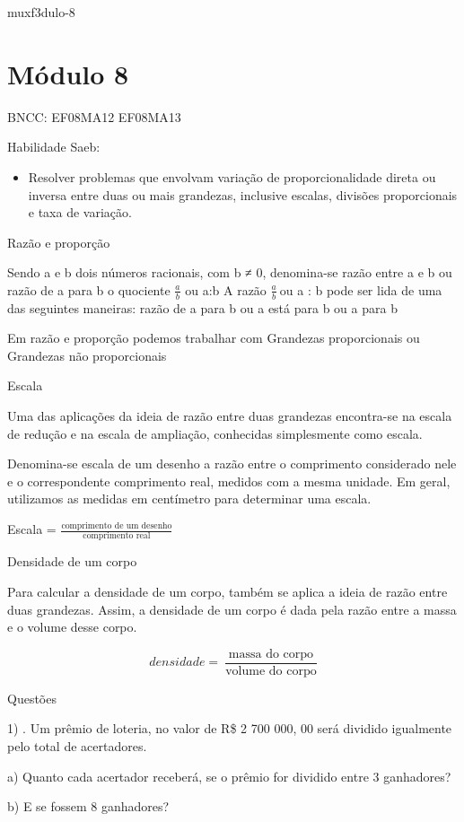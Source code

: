 {muxf3dulo-8}{%
\section{Módulo 8}

BNCC: EF08MA12 EF08MA13

Habilidade Saeb:

\begin{itemize}
\tightlist
\item
  Resolver problemas que envolvam variação de proporcionalidade direta
  ou inversa entre duas ou mais grandezas, inclusive escalas, divisões
  proporcionais e taxa de variação.
\end{itemize}

Razão e proporção

Sendo a e b dois números racionais, com b ≠ 0, denomina-se razão entre a
e b ou razão de a para b o quociente \(\frac{a}{b}\) ou a:b A razão
\(\frac{a}{b}\ \)ou a : b pode ser lida de uma das seguintes maneiras:
razão de a para b ou a está para b ou a para b

Em razão e proporção podemos trabalhar com Grandezas proporcionais ou
Grandezas não proporcionais

Escala

Uma das aplicações da ideia de razão entre duas grandezas encontra-se na
escala de redução e na escala de ampliação, conhecidas simplesmente como
escala.

Denomina-se escala de um desenho a razão entre o comprimento considerado
nele e o correspondente comprimento real, medidos com a mesma unidade.
Em geral, utilizamos as medidas em centímetro para determinar uma
escala.

Escala =
\(\frac{\text{comprimento\ de\ um\ desenho}}{\text{comprimento\ real}}\)

Densidade de um corpo

Para calcular a densidade de um corpo, também se aplica a ideia de razão
entre duas grandezas. Assim, a densidade de um corpo é dada pela razão
entre a massa e o volume desse corpo.

\[densidade = \ \frac{\text{massa\ do\ corpo}}{\text{volume\ do\ corpo}}\]

Questões

1) . Um prêmio de loteria, no valor de R\$ 2 700 000, 00 será dividido
igualmente pelo total de acertadores.

a) Quanto cada acertador receberá, se o prêmio for dividido entre 3
ganhadores?

b) E se fossem 8 ganhadores?

}
